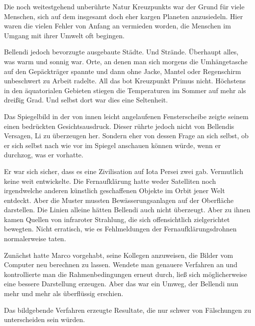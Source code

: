 \par

Die noch weitestgehend unberührte Natur Kreuzpunkts war der Grund für viele Menschen, sich auf dem insgesamt doch eher kargen Planeten anzusiedeln. Hier waren die vielen Fehler von Anfang an vermieden worden, die Menschen im Umgang mit ihrer Umwelt oft begingen.

\par

Bellendi jedoch bevorzugte ausgebaute Städte. Und Strände. Überhaupt alles, was warm und sonnig war. Orte, an denen man sich morgens die Umhängetasche auf den Gepäckträger spannte und dann ohne Jacke, Mantel oder Regenschirm unbeschwert zu Arbeit radelte. All das bot Kreuzpunkt Primus nicht. Höchstens in den äquatorialen Gebieten stiegen die Temperaturen im Sommer auf mehr als dreißig Grad. Und selbst dort war dies eine Seltenheit.

\par

Das Spiegelbild in der von innen leicht angelaufenen Fensterscheibe zeigte seinem einen bedrückten Gesichtsausdruck. Dieser rührte jedoch nicht von Bellendis Versagen, Li zu überzeugen her. Sondern eher von dessen Frage an sich selbst, ob er sich selbst nach wie vor im Spiegel anschauen können würde, wenn er durchzog, was er vorhatte.

\par

Er war sich sicher, dass es eine Zivilisation auf Iota Persei zwei gab. Vermutlich keine weit entwickelte. Die Fernaufklärung hatte weder Satelliten noch irgendwelche anderen künstlich geschaffenen Objekte im Orbit jener Welt entdeckt. Aber die Muster mussten  Bewässerungsanlagen auf der Oberfläche darstellen. Die Linien alleine hätten Bellendi auch nicht überzeugt. Aber zu ihnen kamen Quellen von infraroter Strahlung, die sich offensichtlich zielgerichtet bewegten. Nicht erratisch, wie es Fehlmeldungen der Fernaufklärungsdrohnen normalerweise taten.

\par

Zunächst hatte Marco vorgehabt, seine Kollegen anzuweisen, die Bilder vom Computer neu berechnen zu lassen. Wendete man genauere Verfahren an und kontrollierte man die Rahmenbedingungen erneut durch, ließ sich möglicherweise eine bessere Darstellung erzeugen. Aber das war ein Umweg, der Bellendi nun mehr und mehr als überflüssig erschien.

\par

Das bildgebende Verfahren erzeugte Resultate, die nur schwer von Fälschungen zu unterscheiden sein würden.
